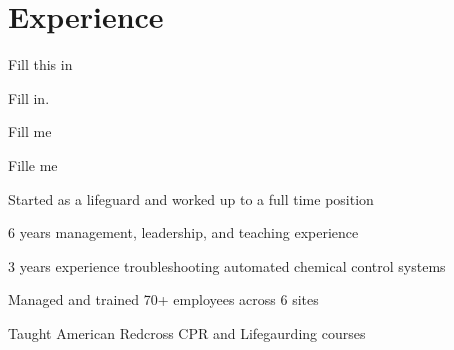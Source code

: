 \documentclass[letterpaper]{resume} %
\begin{document}
\begin{minipage}[t]{0.66\textwidth} %


\section{Experience}


\vspace{\topsep} %
\begin{tightitemize}
\item Fill this in
\end{tightitemize}

\sectionspace %



\begin{tightitemize}
\item Fill in.
\item Fill me
\item Fille me
\end{tightitemize}

\sectionspace %


\begin{tightitemize}
\item Started as a lifeguard and worked up to a full time position
\item 6 years management, leadership, and teaching experience
\item 3 years experience troubleshooting automated chemical control systems
\item Managed and trained 70+ employees across 6 sites
\item Taught American Redcross CPR and Lifegaurding courses
\end{tightitemize}


\end{minipage}
\end{document}
